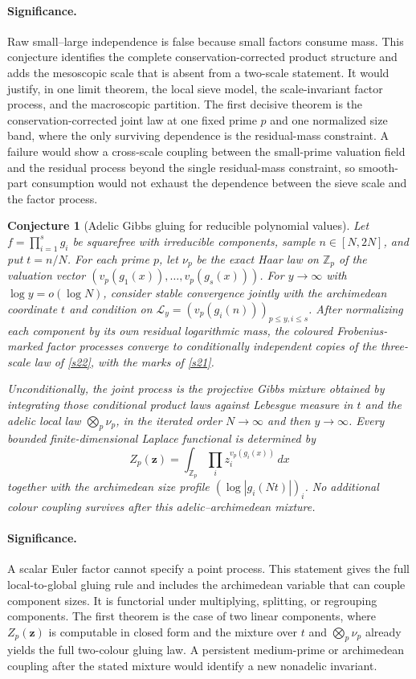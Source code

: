 \documentclass[11pt]{article}
\newtheorem{conjecture}{Conjecture}
\theoremstyle{definition}
\newcommand{\Z}{\mathbb Z}
\providecommand{\Z}{\mathbb Z}
\begin{document}
\paragraph{Significance.}
Raw small--large independence is false because small factors consume mass.  This
conjecture identifies the complete conservation-corrected product structure and adds the
mesoscopic scale that is absent from a two-scale statement.  It would justify, in one
limit theorem, the local sieve model, the scale-invariant factor process, and the macroscopic partition. The first decisive theorem is the conservation-corrected joint law at one fixed prime $p$ and one normalized size band, where the only surviving dependence is the residual-mass constraint. A failure would show a cross-scale coupling between the small-prime valuation field and the residual process beyond the single residual-mass constraint, so smooth-part consumption would not exhaust the dependence between the sieve scale and the factor process.

\begin{conjecture}[Adelic Gibbs gluing for reducible polynomial values]\label{s23}
Let $f=\prod_{i=1}^s g_i$ be squarefree with irreducible components, sample
$n\in[N,2N]$, and put $t=n/N$.  For each prime $p$, let $\nu_p$ be the exact Haar law on
$\Z_p$ of the valuation vector
$(v_p(g_1(x)),\ldots,v_p(g_s(x)))$.  For
$y\to\infty$ with $\log y=o(\log N)$, consider stable convergence jointly with the
archimedean coordinate $t$ and condition on
$\mathscr L_y=(v_p(g_i(n)))_{p\le y,i\le s}$.  After normalizing each component by its
own residual logarithmic mass, the coloured Frobenius-marked factor processes converge
to conditionally independent copies of the three-scale law of \cref{s22}, with the
marks of \cref{s21}.

Unconditionally, the joint process is the projective Gibbs mixture obtained by
integrating those conditional product laws against Lebesgue measure in $t$ and the
adelic local law $\bigotimes_p\nu_p$, in the iterated order $N\to\infty$ and then
$y\to\infty$.  Every bounded finite-dimensional Laplace functional is determined by
\[
 Z_p(\mathbf z)=\int_{\Z_p}\prod_i z_i^{v_p(g_i(x))}\,dx
\]
together with the archimedean size profile $(\log|g_i(Nt)|)_i$.  No additional colour
coupling survives after this adelic--archimedean mixture.
\end{conjecture}

\paragraph{Significance.}
A scalar Euler factor cannot specify a point process.  This statement gives the full
local-to-global gluing rule and includes the archimedean variable that can couple
component sizes.  It is functorial under multiplying, splitting, or regrouping components. The first theorem is the case of two linear components, where $Z_p(\mathbf z)$ is computable in closed form and the mixture over $t$ and $\bigotimes_p\nu_p$ already yields the full two-colour gluing law.  A persistent medium-prime or archimedean coupling after the stated mixture
would identify a new nonadelic invariant.
\end{document}

